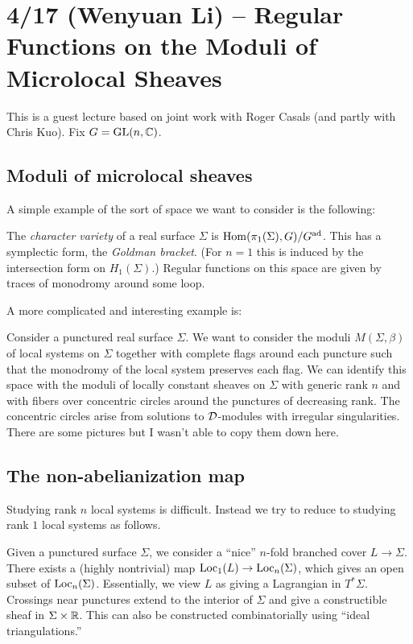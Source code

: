 \documentclass{article}
\begin{document}
\section{4/17 (Wenyuan Li) -- Regular Functions on the Moduli of Microlocal Sheaves}

This is a guest lecture based on joint work with Roger Casals (and partly with Chris Kuo).
Fix $G = \operatorname{GL}(n, \mathbb{C})$.

\subsection{Moduli of microlocal sheaves}

A simple example of the sort of space we want to consider is the following:

\begin{ex}
	The \emph{character variety} of a real surface $\Sigma$ is $\operatorname{Hom}(\pi_1(\Sigma), G) / G^{\operatorname{ad}}$.
	This has a symplectic form, the \emph{Goldman bracket}.
	(For $n = 1$ this is induced by the intersection form on $H_1(\Sigma)$.)
	Regular functions on this space are given by traces of monodromy around some loop.
\end{ex}

A more complicated and interesting example is:

\begin{ex}
	Consider a punctured real surface $\Sigma$.
	We want to consider the moduli $M(\Sigma, \beta)$ of local systems on $\Sigma$ together with complete flags around each puncture such that the monodromy of the local system preserves each flag.
	We can identify this space with the moduli of locally constant sheaves on $\Sigma$ with generic rank $n$ and with fibers over concentric circles around the punctures of decreasing rank.
	The concentric circles arise from solutions to $\mathcal{D}$-modules with irregular singularities.
	There are some pictures but I wasn't able to copy them down here.
\end{ex}

\subsection{The non-abelianization map}

Studying rank $n$ local systems is difficult.
Instead we try to reduce to studying rank $1$ local systems as follows.

Given a punctured surface $\Sigma$, we consider a ``nice'' $n$-fold branched cover $L \to \Sigma$.
There exists a (highly nontrivial) map $\operatorname{Loc}_1(L) \to \operatorname{Loc}_n(\Sigma)$, which gives an open subset of $\operatorname{Loc}_n(\Sigma)$.
Essentially, we view $L$ as giving a Lagrangian in $T^* \Sigma$.
Crossings near punctures extend to the interior of $\Sigma$ and give a constructible sheaf in $\Sigma \times \mathbb{R}$.
This can also be constructed combinatorially using ``ideal triangulations.''
\end{document}
